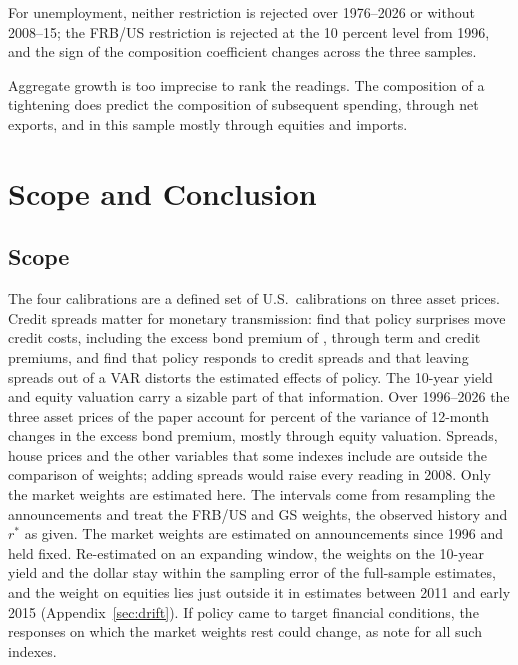 \documentclass[11pt]{article}
\begin{document}


For unemployment, neither restriction is rejected over 1976--2026 or without 2008--15; the FRB/US restriction is rejected at the 10 percent level from 1996, and the sign of the composition coefficient changes across the three samples.

Aggregate growth is too imprecise to rank the readings. The composition of a tightening does predict the composition of subsequent spending, through net exports, and in this sample mostly through equities and imports.
\FloatBarrier

\section{Scope and Conclusion}\label{sec:discussion}
\subsection{Scope}\label{sec:limits}
The four calibrations are a defined set of U.S.\ calibrations on three asset prices. Credit spreads matter for monetary transmission: \citet{gertler2015} find that policy surprises move credit costs, including the excess bond premium of \citet{gilchrist2012}, through term and credit premiums, and \citet{caldara2019} find that policy responds to credit spreads and that leaving spreads out of a VAR distorts the estimated effects of policy. The 10-year yield and equity valuation carry a sizable part of that information. Over 1996--2026 the three asset prices of the paper account for  percent of the variance of 12-month changes in the excess bond premium, mostly through equity valuation. Spreads, house prices and the other variables that some indexes include are outside the comparison of weights; adding spreads would raise every reading in 2008. Only the market weights are estimated here. The intervals come from resampling the  announcements and treat the FRB/US and GS weights, the observed history and $r^*$ as given. The market weights are estimated on announcements since 1996 and held fixed. Re-estimated on an expanding window, the weights on the 10-year yield and the dollar stay within the sampling error of the full-sample estimates, and the weight on equities lies just outside it in estimates between 2011 and early 2015 (Appendix~\ref{sec:drift}). If policy came to target financial conditions, the responses on which the market weights rest could change, as \citet{hatzius2010} note for all such indexes.
\end{document}
